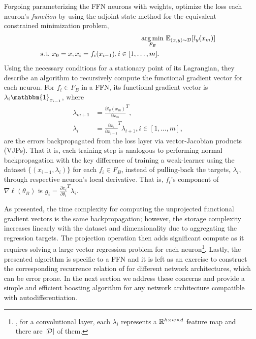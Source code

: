 Forgoing parameterizing the FFN neurons with weights,
\citet{grub2010} optimize the loss \wrt each neuron's \emph{function}
by using the adjoint state method for
the equivalent constrained minimization problem,
%
%
%
\begin{align}
\operatorname*{arg\,min}_{F_B} ~& \mathbb{E}_{(x,y) \sim {\mathcal{D}}} [l_y(x_{m})] \nonumber \\
\begin{split}
\label{eq:forward}
\text{s.t.} ~& x_0 = x, x_{i} = f_{i}(x_{i-1}), i \in [1, \ldots, m].
\end{split}
\end{align}
%
Using the necessary conditions for a stationary point of its Lagrangian,
they describe an algorithm to recursively compute the functional gradient vector for each neuron.
For $f_i \in F_B$ in a FFN, its functional gradient vector is $\lambda_i \mathbbm{1}_{x_{i-1}}$,
where
%
\begin{align}
\lambda_{m+1} &= \frac{\partial l_y(x_m)}{\partial x_m}^T, \nonumber \\
\lambda_{i} &= \frac{\partial x_i}{\partial x_{i-1}}^T \lambda_{i+1},  i \in [1, \ldots, m],
\label{eq:costates}
\end{align}
%
are the errors backpropagated from the loss layer via vector-Jacobian products (VJPs).
That it is, each training step is analogous to performing normal backpropagation
with the key difference of training a weak-learner using the dataset 
$\{(x_{i-1}, \lambda_i)\}$ for each $f_i \in F_B$,
instead of pulling-back the targets, $\lambda_i$, through respective neuron's local derivative.
That is, $f_i$'s component of $\nabla \bar\ell(\theta_B)$ is
$g_i = \frac{\partial x_i}{\partial \theta_i}^T \lambda_i$.

As presented, the time complexity for computing the unprojected
functional gradient vectors is the same backpropagation; however,
the storage complexity increases linearly with the dataset and dimensionality
due to aggregating the regression targets.
The projection operation then adds significant compute as it requires solving a
large vector regression problem for each neuron\footnote{\eg,
for a convolutional layer, each $\lambda_i$ represents a
${\mathbb{R}}^{h \times w \times d}$ feature map and there are $|{\mathcal{D}}|$ of them.}.
Lastly, the presented algorithm is specific to a FFN and it is left
as an exercise to construct the corresponding recurrence relation of 
for different network architectures, which can be error prone.
In the next section we address these concerns and provide a simple and efficient boosting algorithm
for any network architecture compatible with autodifferentiation.
